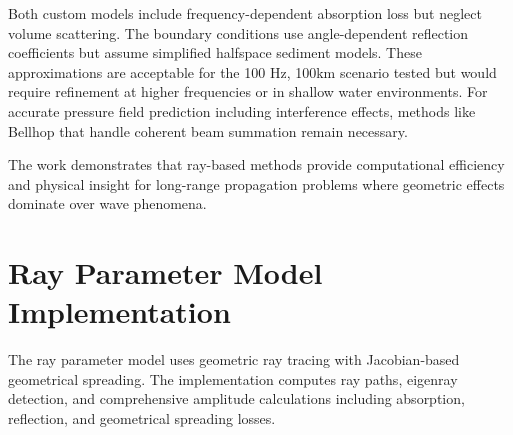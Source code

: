 \documentclass[fleqn]{jaes}
\begin{document}
Both custom models include frequency-dependent absorption loss but neglect volume scattering. The boundary conditions use angle-dependent reflection coefficients but assume simplified halfspace sediment models. These approximations are acceptable for the 100 Hz, 100km scenario tested but would require refinement at higher frequencies or in shallow water environments. For accurate pressure field prediction including interference effects, methods like Bellhop that handle coherent beam summation remain necessary.

The work demonstrates that ray-based methods provide computational efficiency and physical insight for long-range propagation problems where geometric effects dominate over wave phenomena.




\appendix

\section{Ray Parameter Model Implementation}

The ray parameter model uses geometric ray tracing with Jacobian-based geometrical spreading. The implementation computes ray paths, eigenray detection, and comprehensive amplitude calculations including absorption, reflection, and geometrical spreading losses.
\end{document}
